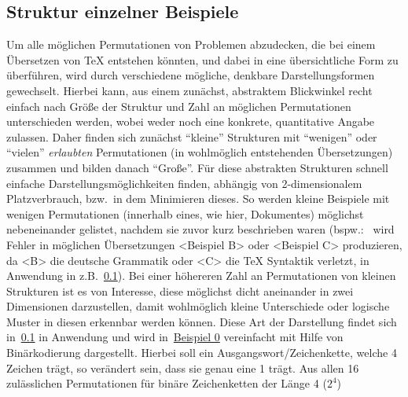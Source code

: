 \subsection{Struktur einzelner Beispiele}
Um alle möglichen Permutationen von Problemen abzudecken, die bei einem Übersetzen von \TeX{} entstehen könnten, und dabei in eine übersichtliche Form zu überführen, wird durch verschiedene mögliche, denkbare Darstellungsformen gewechselt. Hierbei kann, aus einem zunächst, abstraktem Blickwinkel recht einfach nach Größe der Struktur und Zahl an möglichen Permutationen unterschieden werden, wobei weder noch eine konkrete, quantitative Angabe zulassen. Daher finden sich zunächst \enquote{kleine} Strukturen mit \enquote{wenigen} oder \enquote{vielen} \textit{erlaubten} Permutationen (in wohlmöglich entstehenden Übersetzungen) zusammen und bilden danach \enquote{Große}.%
Für diese abstrakten Strukturen schnell einfache Darstellungsmöglichkeiten finden, abhängig von 2-dimensionalem Platzverbrauch, bzw.\ in dem Minimieren dieses. So werden kleine Beispiele mit wenigen Permutationen (innerhalb eines, wie hier, Dokumentes) möglichst nebeneinander gelistet, nachdem sie zuvor kurz beschrieben waren
(bspw.:\ <Beispiel A> wird Fehler in möglichen Übersetzungen <Beispiel B> oder <Beispiel C> produzieren, da <B> die deutsche Grammatik oder <C> die \TeX{} Syntaktik verletzt, in Anwendung in z.B.~\ref{}).
Bei einer höhereren Zahl an Permutationen von kleinen Strukturen ist es von Interesse, diese möglichst dicht aneinander in zwei Dimensionen darzustellen, damit wohlmöglich kleine Unterschiede oder logische Muster in diesen erkennbar werden können. Diese Art der Darstellung findet sich in~\ref{} in Anwendung und wird in~\hyperref[tab:problems:exampleExample]{Beispiel 0} vereinfacht mit Hilfe von Binärkodierung dargestellt. Hierbei soll ein Ausgangswort/Zeichenkette, welche 4 Zeichen trägt, so verändert sein, dass sie genau eine 1 trägt. Aus allen 16 zulässlichen Permutationen für binäre Zeichenketten der Länge 4 ($2^4$)%
